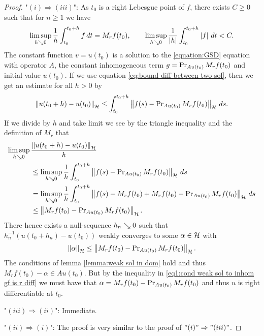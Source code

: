 \begin{proof}
	"$ (i)\Rightarrow(iii) $": 
	As $ t_0 $ is a right Lebesgue point of $ f $,
	there exists $ C\geq 0 $ such that for $ n\geq 1 $ we have
	\begin{align*}
		\limsup_{h\searrow 0}
		\frac{1}{h}\int_{t_0}^{t_0+h}f\,dt
		=M_rf(t_0),
		\qquad \limsup_{h\searrow 0}
		\frac{1}{\left\vert h\right\vert}\int_{t_0}^{t_0+h}\left\vert f\right\vert\,dt
		<C.
	\end{align*}The constant function
	$ v=u(t_0) $ is a solution to the \ref{equation:GSD}
	equation with operator $ A $, the constant
	inhomogeneous term $ g=\operatorname{\mathrm{Pr}}_{Au(t_0)} M_rf(t_0) $
	and initial value $ u(t_0) $. If we use equation
	\eqref{eq:bound diff between two sol}, then we get
	an estimate for all $ h>0 $ by
	\begin{align*}
		\left\Vert u(t_0+h)-u(t_0)\right\Vert_{\mathcal{H}}
		\leq \int_{t_0}^{t_0+h}
		\left\Vert f(s)-\operatorname{\mathrm{Pr}}_{Au(t_0)} M_rf(t_0)\right\Vert_{\mathcal{H}}\,ds.
	\end{align*}
	If we divide by $ h $ and take limit we see by the triangle
	inequality and the definition of $ M_r $ that
	\begin{align*}
		\limsup_{h \searrow 0}\,&\frac{\left\Vert u(t_0+h)-u(t_0)\right\Vert_{\mathcal{H}}}{h}\\
		&\leq 
		\limsup_{h \searrow 0}\frac{1}{h}\int_{t_0}^{t_0+h}
		\left\Vert f(s)-\operatorname{\mathrm{Pr}}_{Au(t_0)} M_rf(t_0)\right\Vert_{\mathcal{H}}\,ds\\
		&= \limsup_{h \searrow 0}\frac{1}{h}\int_{t_0}^{t_0+h}
		\left\Vert f(s)-M_rf(t_0)+M_rf(t_0)-\operatorname{\mathrm{Pr}}_{Au(t_0)} M_rf(t_0)\right\Vert_{\mathcal{H}}\,ds\\
		&\leq \left\Vert M_rf(t_0)-\operatorname{\mathrm{Pr}}_{Au(t_0)} M_rf(t_0)\right\Vert_{\mathcal{H}}.
	\end{align*}
	There hence exists a null-sequence $ h_n\searrow 0 $ such that 
	$ h_n^{-1}(u(t_0+h_n)-u(t_0)) $ weakly converges to
	some $ \alpha\in\mathcal{H} $ with
	\begin{align}\label{eq1:cond weak sol to inhom gf is r diff}
		\left\Vert \alpha\right\Vert_{\mathcal{H}}
		\leq \left\Vert M_rf(t_0)-\operatorname{\mathrm{Pr}}_{Au(t_0)} M_rf(t_0)\right\Vert_{\mathcal{H}}.
	\end{align} 
	The conditions of lemma \ref{lemma:weak sol in dom} hold
	and thus $ M_r f(t_0)-\alpha\in Au(t_0) $. But
	by the inequality in \eqref{eq1:cond weak sol to inhom gf is r diff}
	we must have that $ \alpha=M_rf(t_0)-\operatorname{\mathrm{Pr}}_{Au(t_0)} M_rf(t_0) $
	and thus $ u $ is right differentiable at $ t_0 $.\medskip
	
	"$(iii)\Rightarrow(ii)$": Immediate.\medskip
	
	"$(ii)\Rightarrow(i)$": The proof is very
	similar to the proof of $ "(i)"\Rightarrow"(iii)" $.
\end{proof}

